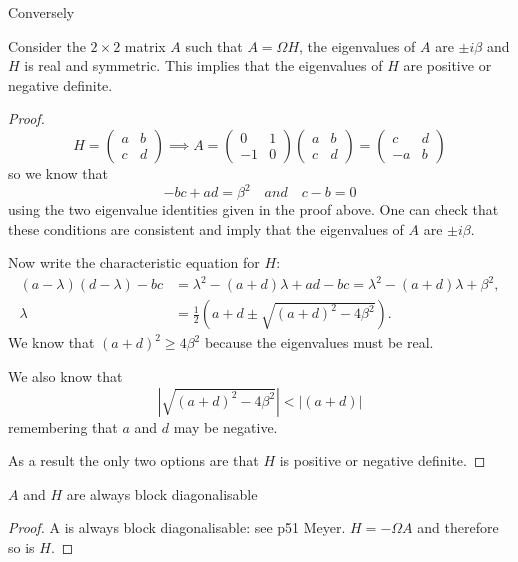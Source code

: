 Conversely
\begin{lemma}Consider the $2 \times 2$ matrix $A$ such that $A=\Omega H$, the eigenvalues of $A$ are $\pm i \beta$ and $H$ is real and symmetric. This implies that the eigenvalues of $H$ are positive or negative definite. \label{lem:atoh}
\end{lemma}
\begin{proof}
\begin{equation}
H = \begin{pmatrix} a & b \\ c & d \end{pmatrix} \implies A = \begin{pmatrix} 0 & 1 \\ -1 & 0 \end{pmatrix} \begin{pmatrix} a & b \\ c & d \end{pmatrix} = \begin{pmatrix} c & d \\ -a & b \end{pmatrix}
\end{equation}
so we know that
\begin{equation}
-bc+ad = \beta^2 \quad and \quad c-b=0
\end{equation}
using the two eigenvalue identities given in the proof above. One can check that these conditions are consistent and imply that the eigenvalues of $A$ are $\pm i \beta$.

Now write the characteristic equation for $H$:
\begin{equation}
\begin{aligned}
(a-\lambda)(d-\lambda) - bc &= \lambda^2-(a+d)\lambda +ad - bc = \lambda^2 - (a+d)\lambda + \beta^2, \\
\lambda &= \frac{1}{2}\left(a+d \pm \sqrt{(a+d)^2-4\beta^2}\right).
\end{aligned}
\end{equation}
We know that $(a+d)^2 \geq 4\beta^2$ because the eigenvalues must be real.

We also know that
\begin{equation}
| \sqrt{(a+d)^2 - 4\beta^2} | < |(a+d)|
\end{equation}
remembering that $a$ and $d$ may be negative.

As a result the only two options are that $H$ is positive or negative definite.
\end{proof}
\begin{lemma} $A$ and $H$ are always block diagonalisable \label{lem:adiag} \end{lemma} 
\begin{proof}
A is always block diagonalisable: see p51 Meyer. $H = -\Omega A$ and therefore so is $H$.
\end{proof}

